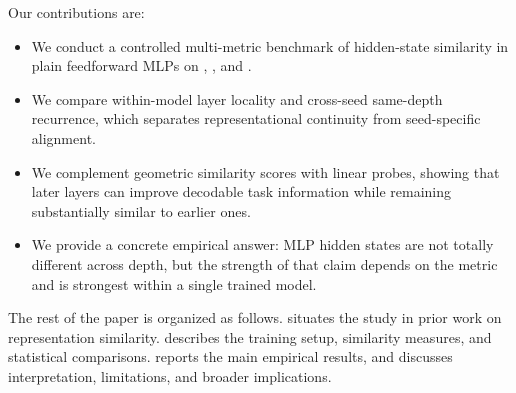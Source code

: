 Our contributions are:
\begin{itemize}
    \item We conduct a controlled multi-metric benchmark of hidden-state similarity in plain feedforward MLPs on \mnist, \fashionmnist, and \cifar.
    \item We compare within-model layer locality and cross-seed same-depth recurrence, which separates representational continuity from seed-specific alignment.
    \item We complement geometric similarity scores with linear probes, showing that later layers can improve decodable task information while remaining substantially similar to earlier ones.
    \item We provide a concrete empirical answer: MLP hidden states are not totally different across depth, but the strength of that claim depends on the metric and is strongest within a single trained model.
\end{itemize}

The rest of the paper is organized as follows.  situates the study in prior work on representation similarity.  describes the training setup, similarity measures, and statistical comparisons.  reports the main empirical results, and  discusses interpretation, limitations, and broader implications.
